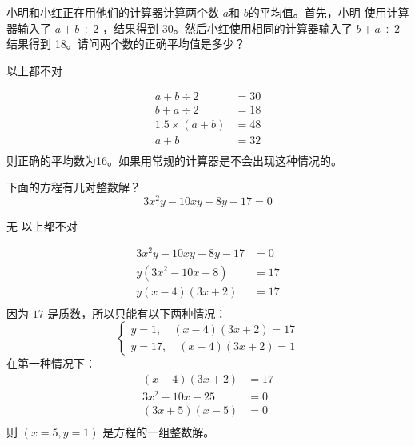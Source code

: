 \begin{questions}
	\question 小明和小红正在用他们的计算器计算两个数 \( a \)和 \( b \)的平均值。首先，小明 使用计算器输入了 \( a + b
	\div 2 \) ，结果得到 \( 30 \)。然后小红使用相同的计算器输入了 \( b + a \div 2 \)结果得到 18。请问两个数的正确平均值是多少？

	\begin{oneparchoices}
		    \choice 以上都不对
	\end{oneparchoices}

	\begin{solution}
		\begin{align*}
			a    + b \div 2   & = 30 \\
			b    + a \div 2   & = 18 \\
			1.5  \times (a+b) & = 48 \\
			a    + b          & = 32 \\
		\end{align*}
		则正确的平均数为16。如果用常规的计算器是不会出现这种情况的。
	\end{solution}

	\question 下面的方程有几对整数解？
	\begin{equation}
		3x^2y - 10xy - 8y - 17 = 0
	\end{equation}
	\begin{oneparchoices}
		\choice 无    \choice 以上都不对
	\end{oneparchoices}

	\begin{solution}
		\begin{align*}
			3x^2y - 10xy - 8y - 17 & = 0  \\
			y(3x^2 - 10x - 8)      & = 17 \\
			y(x-4)(3x+2)           & = 17 \\
		\end{align*}
		因为 \( 17 \) 是质数，所以只能有以下两种情况：
		\begin{equation*}
			\begin{cases}
				y = 1, \quad (x-4)(3x+2) = 17 \\
				y = 17,\quad  (x-4)(3x+2) = 1
			\end{cases}
		\end{equation*}
		在第一种情况下：
		\begin{align*}
			(x-4)(3x+2)     & = 17 \\
			3x^2 -10x - 25  & = 0  \\
			(3x + 5)(x - 5) & = 0  \\
		\end{align*}
		则 \( (x=5, y=1) \) 是方程的一组整数解。


\end{solution}
\end{questions}
